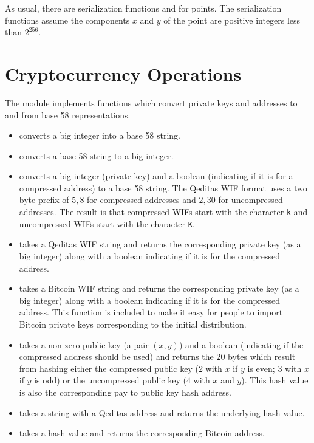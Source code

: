 As usual, there are serialization functions {} and {} for
points. The serialization functions assume the components $x$ and $y$ of the point
are positive integers less than $2^{256}$.

\section{Cryptocurrency Operations}

The module {} implements
functions which convert private keys and addresses 
to and from base 58 representations.
\begin{itemize}
\item {} converts a big integer into a base 58 string.
\item {} converts a base 58 string to a big integer.
\item {} converts a big integer (private key) and a boolean (indicating if it is for a compressed address) to a base 58 string.
The Qeditas WIF format uses a two byte prefix of $5,8$ for compressed addresses
and $2,30$ for uncompressed addresses.
The result is that compressed WIFs start with the character {\tt{k}} and uncompressed WIFs start
with the character {\tt{K}}.
\item {} takes a Qeditas WIF string and returns the corresponding
private key (as a big integer) along with a boolean indicating if it is for the compressed address.
\item {} takes a Bitcoin WIF string and returns the corresponding
private key (as a big integer) along with a boolean indicating if it is for the compressed address.
This function is included to make it easy for people to import Bitcoin private keys corresponding to the
initial distribution.
\item {} takes a non-zero public key (a pair $(x,y)$) and a boolean (indicating if the compressed address should be used)
and returns the $20$ bytes which result from hashing
either the compressed public key ($2$ with $x$ if $y$ is even; $3$ with $x$ if $y$ is odd)
or the uncompressed public key ($4$ with $x$ and $y$).
This hash value is also the corresponding pay to public key hash address.
\item {} takes a string with a Qeditas address and returns the underlying hash value.
\item {} takes a hash value and returns the corresponding Bitcoin address.

\end{itemize}
